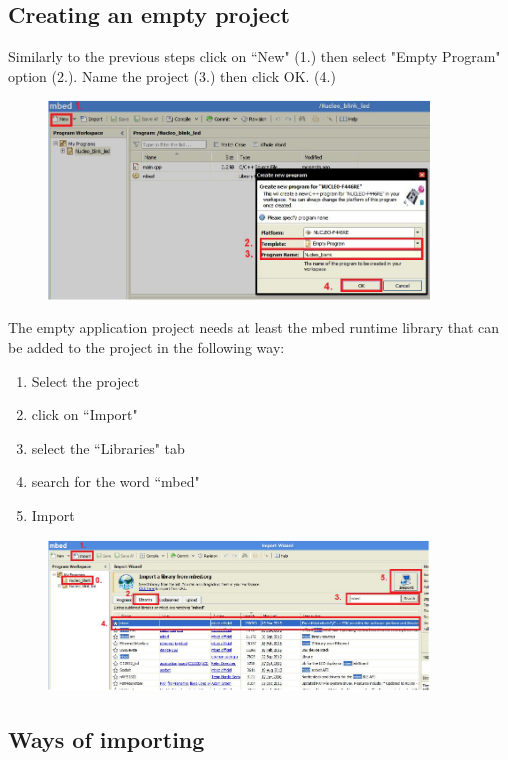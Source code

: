 \documentclass[a4paper]{article}
\begin{document}
\subsection{Creating an empty project}
Similarly to the previous steps click on ``New" (1.) then select "Empty Program" option (2.). Name the project (3.) then click OK. (4.)

\begin{figure}[H]
    \centering
    \includegraphics[width=0.9\textwidth]{figures/mbed-empty-proj.png}
\end{figure}

The empty application project needs at least the mbed runtime library that can be added to the project in the following way:
\begin{enumerate}
  \setcounter{enumi}{0}
  \item Select the project
  \item click on ``Import"
  \item select the ``Libraries" tab
  \item search for the word ``mbed"
  \item Import
\end{enumerate}

\begin{figure}[H]
    \centering
    \includegraphics[width=0.9\textwidth]{figures/mbed-import.png}
\end{figure}

\subsection{Ways of importing}
\end{document}
